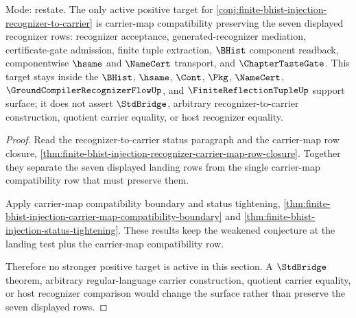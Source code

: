 \begin{theorem}
\label{thm:finite-bhist-injection-carrier-map-active-target}
Mode: restate. The only active positive target for \autoref{conj:finite-bhist-injection-recognizer-to-carrier} is carrier-map compatibility preserving the seven displayed recognizer rows: recognizer acceptance, generated-recognizer mediation, certificate-gate admission, finite tuple extraction, $\BHist$ component readback, componentwise $\hsame$ and $\NameCert$ transport, and $\ChapterTasteGate$. This target stays inside the $\BHist$, $\hsame$, $\Cont$, $\Pkg$, $\NameCert$, $\GroundCompilerRecognizerFlowUp$, and $\FiniteReflectionTupleUp$ support surface; it does not assert $\StdBridge$, arbitrary recognizer-to-carrier construction, quotient carrier equality, or host recognizer equality.
\end{theorem}
\begin{proof}
Read the recognizer-to-carrier status paragraph and the carrier-map row closure, \autoref{thm:finite-bhist-injection-recognizer-carrier-map-row-closure}. Together they separate the seven displayed landing rows from the single carrier-map compatibility row that must preserve them.

Apply carrier-map compatibility boundary and status tightening, \autoref{thm:finite-bhist-injection-carrier-map-compatibility-boundary} and \autoref{thm:finite-bhist-injection-status-tightening}. These results keep the weakened conjecture at the landing test plus the carrier-map compatibility row.

Therefore no stronger positive target is active in this section. A $\StdBridge$ theorem, arbitrary regular-language carrier construction, quotient carrier equality, or host recognizer comparison would change the surface rather than preserve the seven displayed rows.
\end{proof}

